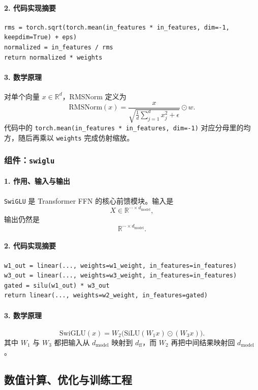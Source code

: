 \documentclass[UTF8,a4paper,11pt]{ctexart}
\begin{document}
\paragraph{2. 代码实现摘要}
\begin{lstlisting}
rms = torch.sqrt(torch.mean(in_features * in_features, dim=-1, keepdim=True) + eps)
normalized = in_features / rms
return normalized * weights
\end{lstlisting}

\paragraph{3. 数学原理}
对单个向量 \(x \in \mathbb{R}^{d}\)，RMSNorm 定义为
\[
\mathrm{RMSNorm}(x)=
\frac{x}{\sqrt{\frac{1}{d}\sum_{j=1}^{d}x_j^2+\epsilon}}
\odot w.
\]
代码中的 \texttt{torch.mean(in\_features * in\_features, dim=-1)} 对应分母里的均方，随后再乘以 \texttt{weights} 完成仿射缩放。

\subsubsection{组件：\texttt{swiglu}}
\paragraph{1. 作用、输入与输出}
\texttt{SwiGLU} 是 Transformer FFN 的核心前馈模块。输入是
\[
X \in \mathbb{R}^{\cdots \times d_{\text{model}}},
\]
输出仍然是
\[
\mathbb{R}^{\cdots \times d_{\text{model}}}.
\]

\paragraph{2. 代码实现摘要}
\begin{lstlisting}
w1_out = linear(..., weights=w1_weight, in_features=in_features)
w3_out = linear(..., weights=w3_weight, in_features=in_features)
gated = silu(w1_out) * w3_out
return linear(..., weights=w2_weight, in_features=gated)
\end{lstlisting}

\paragraph{3. 数学原理}
\[
\mathrm{SwiGLU}(x)=W_2\big(\mathrm{SiLU}(W_1x)\odot (W_3x)\big).
\]
其中 \(W_1\) 与 \(W_3\) 都把输入从 \(d_{\text{model}}\) 映射到 \(d_{\text{ff}}\)，而 \(W_2\) 再把中间结果映射回 \(d_{\text{model}}\)。

\subsection{数值计算、优化与训练工程}
\end{document}

